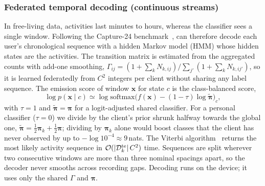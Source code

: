 \subsubsection{Federated temporal decoding (continuous streams)}
In free-living data, activities last minutes to hours, whereas the classifier sees a single
window. Following the Capture-24 benchmark~\cite{chan2024capture24,walmsley2022reallocation}, \method{}
can therefore decode each
user's chronological sequence with a hidden Markov model (HMM) whose hidden states are the
activities. The transition matrix is estimated from the aggregated counts with add-one smoothing,
$\Gamma_{ij}=(1+\sum_kN_{k,ij})/\sum_{j'}(1+\sum_kN_{k,ij'})$, so it is learned federatedly from
$C^2$ integers per client without sharing any label sequence. The emission score of window
$\mathbf{x}$ for state $c$ is the class-balanced score,
\begin{equation}\label{eq:emission}
  \log p(\mathbf{x}\mid c)\simeq\log\mathrm{softmax}\big(f(\mathbf{x})-(1-\tau)\log\tilde{\boldsymbol{\pi}}\big)_c,
\end{equation}
with $\tau=1$ and $\tilde{\boldsymbol{\pi}}=\boldsymbol{\pi}$ for a logit-adjusted shared classifier. For a
personal classifier ($\tau=0$) we divide by the client's prior shrunk halfway towards the global
one, $\tilde{\boldsymbol{\pi}}=\tfrac12\boldsymbol{\pi}_k+\tfrac12\boldsymbol{\pi}$; dividing by
$\boldsymbol{\pi}_k$ alone would boost classes that the client has never observed by up to
$-\log10^{-4}\approx9$\,nats. The Viterbi algorithm~\cite{viterbi1967error} returns the most likely
activity sequence in $\mathcal{O}(|\mathcal{D}_k^{\mathrm{te}}|\,C^2)$ time. Sequences are split wherever two
consecutive windows are more than three nominal spacings apart, so the decoder never smooths across
recording gaps. Decoding runs on the device; it uses only the shared $\Gamma$ and $\boldsymbol{\pi}$.


